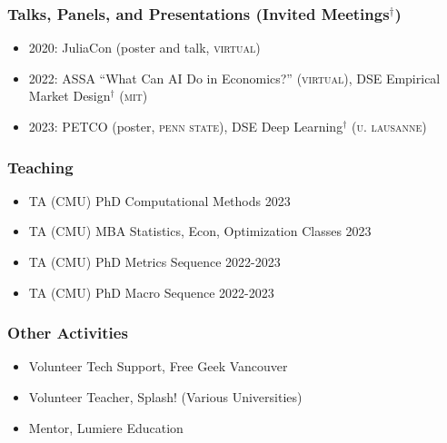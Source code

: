 \documentclass[12pt]{article}   %
\begin{document}
\subsubsection*{Talks, Panels, and Presentations (Invited Meetings$^{\dagger}$)}
\begin{itemize}
  \item 2020: JuliaCon (poster and talk, \textsc{virtual})
  \item 2022: ASSA ``What Can AI Do in Economics?'' (\textsc{virtual}), DSE Empirical Market Design$^{\dagger}$ (\textsc{mit})
  \item 2023: PETCO (poster, \textsc{penn state}), DSE Deep Learning$^{\dagger}$ (\textsc{u. lausanne})
\end{itemize}


\subsubsection*{Teaching}
\begin{itemize}
  \item TA (CMU) \hspace{7 em} PhD Computational Methods  \hfill 2023
  \item TA (CMU) \hspace{7 em} MBA Statistics, Econ, Optimization Classes \hfill 2023
  \item TA (CMU) \hspace{7 em} PhD Metrics Sequence \hfill 2022-2023
  \item TA (CMU) \hspace{7 em} PhD Macro Sequence \hfill 2022-2023
\end{itemize}




\subsubsection*{Other Activities}
\begin{itemize}
  \item Volunteer Tech Support, Free Geek Vancouver 
  
  \item Volunteer Teacher, Splash! (Various Universities)
  
  \item Mentor, Lumiere Education
\end{itemize}
\end{document}
